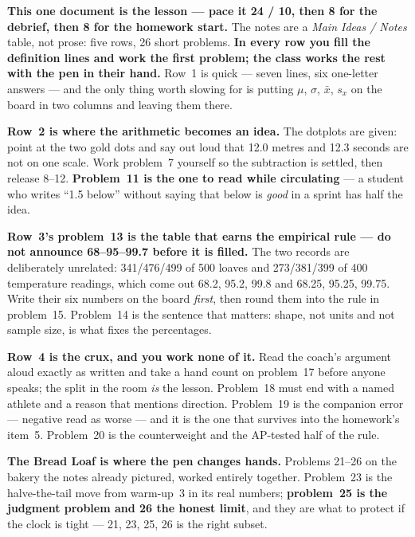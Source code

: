 \documentclass[10pt]{article}
\begin{document}
\begin{teachernote}
\textbf{This one document is the lesson --- pace it 24 / 10, then 8 for the debrief, then 8 for
the homework start.} The notes are a \emph{Main Ideas / Notes} table, not prose: five rows, 26
short problems. \textbf{In every row you fill the definition lines and work the first problem;
the class works the rest with the pen in their hand.} Row~1 is quick --- seven lines, six
one-letter answers --- and the only thing worth slowing for is putting $\mu$, $\sigma$, $\bar x$,
$s_x$ on the board in two columns and leaving them there.

\textbf{Row~2 is where the arithmetic becomes an idea.} The dotplots are given: point at the two
gold dots and say out loud that 12.0 metres and 12.3 seconds are not on one scale. Work
problem~7 yourself so the subtraction is settled, then release 8--12. \textbf{Problem~11 is the
one to read while circulating} --- a student who writes ``1.5 below'' without saying that below
is \emph{good} in a sprint has half the idea.

\textbf{Row~3's problem~13 is the table that earns the empirical rule --- do not announce
68--95--99.7 before it is filled.} The two records are deliberately unrelated: 341/476/499 of 500
loaves and 273/381/399 of 400 temperature readings, which come out 68.2, 95.2, 99.8 and 68.25,
95.25, 99.75. Write their six numbers on the board \emph{first}, then round them into the rule in
problem~15. Problem~14 is the sentence that matters: shape, not units and not sample size, is
what fixes the percentages.

\textbf{Row~4 is the crux, and you work none of it.} Read the coach's argument aloud exactly as
written and take a hand count on problem~17 before anyone speaks; the split in the room \emph{is}
the lesson. Problem~18 must end with a named athlete and a reason that mentions direction.
Problem~19 is the companion error --- negative read as worse --- and it is the one that survives
into the homework's item~5. Problem~20 is the counterweight and the AP-tested half of the rule.

\textbf{The Bread Loaf is where the pen changes hands.} Problems 21--26 on the bakery the notes
already pictured, worked entirely together. Problem~23 is the halve-the-tail move from warm-up~3
in its real numbers; \textbf{problem~25 is the judgment problem and 26 the honest limit}, and
they are what to protect if the clock is tight --- 21, 23, 25, 26 is the right subset.


\end{teachernote}
\end{document}
